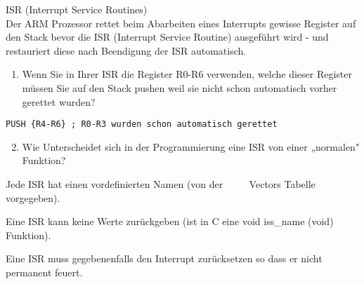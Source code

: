 \begin{example2}{ISR (Interrupt Service Routines)}\\
Der ARM Prozessor rettet beim Abarbeiten eines Interrupts gewisse Register auf den Stack bevor die ISR (Interrupt Service Routine) ausgeführt wird - und restauriert diese nach Beendigung der ISR automatisch.

\begin{enumerate}
  \item Wenn Sie in Ihrer ISR die Register R0-R6 verwenden, welche dieser Register müssen Sie auf den Stack pushen weil sie nicht schon automatisch vorher gerettet wurden?
\end{enumerate}

\begin{verbatim}
PUSH {R4-R6} ; R0-R3 wurden schon automatisch gerettet
\end{verbatim}

\begin{enumerate}
  \setcounter{enumi}{1}
  \item Wie Unterscheidet sich in der Programmierung eine ISR von einer „normalen" Funktion?
\end{enumerate}

Jede ISR hat einen vordefinierten Namen (von der $\qquad$ Vectors Tabelle vorgegeben).

Eine ISR kann keine Werte zurückgeben (ist in C eine void iss\_name (void) Funktion).

Eine ISR muss gegebenenfalls den Interrupt zurücksetzen so dass er nicht permanent feuert.

\end{example2}




